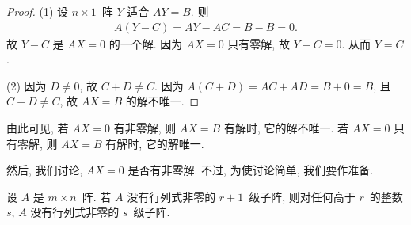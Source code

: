 \documentclass[../libro.tex]{subfiles}
\begin{document}
\begin{proof}
    (1)
    设 \(n \times 1\)~阵 \(Y\) 适合 \(AY = B\).
    则
    \begin{align*}
        A(Y - C) = AY - AC = B - B = 0.
    \end{align*}
    故 \(Y - C\) 是 \(AX = 0\) 的一个解.
    因为 \(AX = 0\) 只有零解,
    故 \(Y - C = 0\).
    从而 \(Y = C\).




    (2)
    因为 \(D \neq 0\), 故 \(C + D \neq C\).
    因为 \(A(C + D) = AC + AD = B + 0 = B\),
    且 \(C + D \neq C\),
    故 \(AX = B\) 的解不唯一.
\end{proof}

由此可见, 若 \(AX = 0\) 有非零解,
则 \(AX = B\) 有解时,
它的解不唯一.
若 \(AX = 0\) 只有零解,
则 \(AX = B\) 有解时,
它的解唯一.

然后, 我们讨论, \(AX = 0\) 是否有非零解.
不过, 为使讨论简单, 我们要作准备.

\begin{theorem}
    设 \(A\) 是 \(m \times n\)~阵.
    若 \(A\) 没有行列式非零的 \(r+1\)~级子阵,
    则对任何高于 \(r\)~的整数 \(s\),
    \(A\) 没有行列式非零的 \(s\)~级子阵.
\end{theorem}
\end{document}
